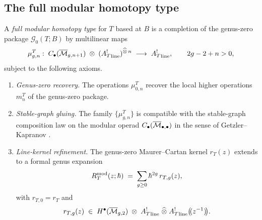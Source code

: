 \subsection{The full modular homotopy type}
\label{subsec:full-modular-homotopy-type}

\begin{definition}
\label{def:full-modular-homotopy-type}
A \emph{full modular homotopy type} for $T$ based at $B$ is a completion of the genus-zero
package $\mathcal G_0(T;B)$ by multilinear maps
\begin{equation}
\label{eq:modular-operations}
\mu_{g,n}^T:\;
C_\bullet(\overline{\mathcal M}_{g,n+1})\;\otimes\;({A_T^!}_{\mathrm{line}})^{\widehat\otimes\, n}
\;\longrightarrow\;{A_T^!}_{\mathrm{line}},
\qquad 2g-2+n>0,
\end{equation}
subject to the following axioms.
\begin{enumerate}[label=\textup{(\alph*)}]
\item \emph{Genus-zero recovery.} The operations $\mu_{0,n}^T$ recover the local higher
operations $m_n^T$ of the genus-zero package.

\item \emph{Stable-graph gluing.} The family $\{\mu_{g,n}^T\}$ is compatible with the
stable-graph composition law on the modular operad
$C_\bullet(\overline{\mathcal M}_{\bullet,\bullet})$ in the sense of Getzler--Kapranov \cite{GeK98}.

\item \emph{Line-kernel refinement.} The genus-zero Maurer--Cartan kernel $r_T(z)$ extends to
a formal genus expansion
\begin{equation}
\label{eq:modular-r-matrix-celestial}
R_T^{\mathrm{mod}}(z;\hbar)
\;=\;\sum_{g\ge 0}\hbar^{2g}\,r_{T,g}(z),
\end{equation}
with $r_{T,0}=r_T$ and
\[
r_{T,g}(z)\;\in\;
H^\bullet(\overline{\mathcal M}_{g,2})\;\otimes\;{A_T^!}_{\mathrm{line}}\;\widehat\otimes\;{A_T^!}_{\mathrm{line}}\bigl(\!(z^{-1})\!\bigr).
\]
\end{enumerate}
\end{definition}


